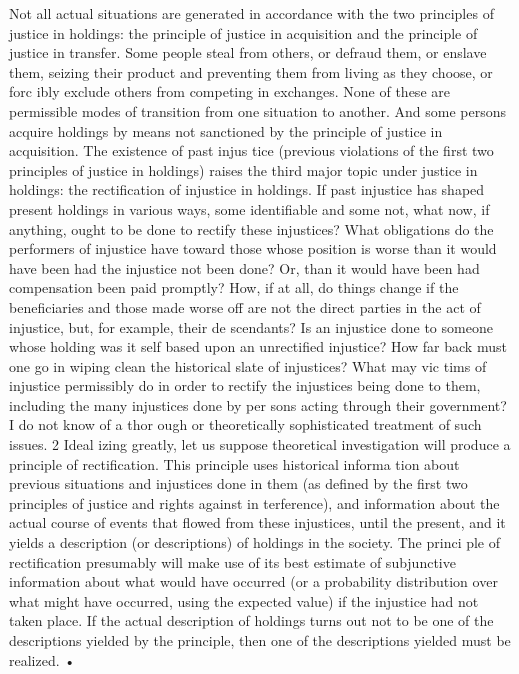 \documentclass[11pt,openany]{book}
\begin{document}
Not all actual situations are generated in accordance with the two principles of justice in holdings: the principle of justice in acquisition and the principle of justice in transfer. Some people steal from others, or defraud them, or enslave them, seizing their product and preventing them from living as they choose, or forc ibly exclude others from competing in exchanges. None of these are permissible modes of transition from one situation to another. And some persons acquire holdings by means not sanctioned by the principle of justice in acquisition. The existence of past injus tice (previous violations of the first two principles of justice in holdings) raises the third major topic under justice in holdings: the rectification of injustice in holdings. If past injustice has shaped present holdings in various ways, some identifiable and some not, what now, if anything, ought to be done to rectify these injustices? What obligations do the performers of injustice have toward those whose position is worse than it would have been had the injustice not been done? Or, than it would have been had compensation been paid promptly? How, if at all, do things change if the beneficiaries and those made worse off are not the direct parties in the act of injustice, but, for example, their de scendants? Is an injustice done to someone whose holding was it self based upon an unrectified injustice? How far back must one go in wiping clean the historical slate of injustices? What may vic tims of injustice permissibly do in order to rectify the injustices being done to them, including the many injustices done by per sons acting through their government? I do not know of a thor ough or theoretically sophisticated treatment of such issues. 2 Ideal izing greatly, let us suppose theoretical investigation will produce a principle of rectification. This principle uses historical informa tion about previous situations and injustices done in them (as defined by the first two principles of justice and rights against in terference), and information about the actual course of events that flowed from these injustices, until the present, and it yields a description (or descriptions) of holdings in the society. The princi ple of rectification presumably will make use of its best estimate of subjunctive information about what would have occurred (or a probability distribution over what might have occurred, using the expected value) if the injustice had not taken place. If the actual description of holdings turns out not to be one of the descriptions yielded by the principle, then one of the descriptions yielded must be realized. • 
\end{document}
